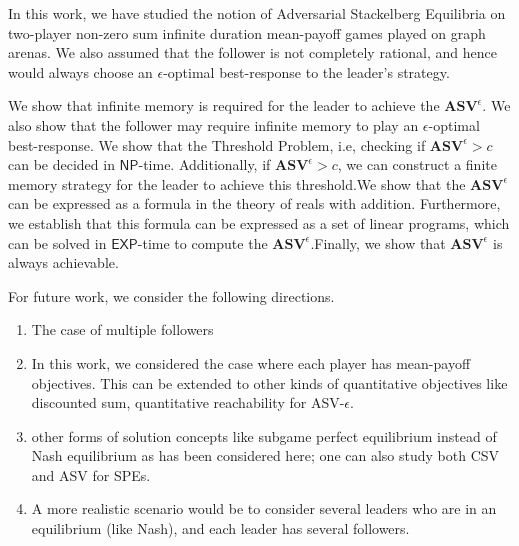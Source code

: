 In this work, we have studied the notion of Adversarial Stackelberg Equilibria on two-player non-zero sum infinite duration mean-payoff games played on graph arenas. We also assumed that the follower is not completely rational, and hence would always choose an $\epsilon$-optimal best-response to the leader's strategy.

We show that infinite memory is required for the leader to achieve the $\mathbf{ASV}^{\epsilon}$. We also show that the follower may require infinite memory to play an $\epsilon$-optimal best-response. We show that the Threshold Problem, i.e, checking if $\mathbf{ASV}^{\epsilon} > c$ can be decided in $\mathsf{NP}$-time. Additionally, if $\mathbf{ASV}^{\epsilon} > c$, we can construct a finite memory strategy for the leader to achieve this threshold.We show that the $\mathbf{ASV}^{\epsilon}$ can be expressed as a formula in the theory of reals with addition. Furthermore, we establish that this formula can be expressed as a set of linear programs, which can be solved in $\mathsf{EXP}$-time to compute the $\mathbf{ASV}^{\epsilon}$.Finally, we show that $\mathbf{ASV}^{\epsilon}$ is always achievable.

For future work, we consider the following directions.
\begin{enumerate}
    \item The case of multiple followers
    \item In this work, we considered the case where each player has mean-payoff objectives. This can be extended to other kinds of quantitative objectives like discounted sum, quantitative reachability for ASV-$\epsilon$.
    \item other forms of solution concepts like subgame perfect equilibrium instead of Nash equilibrium as has been considered here; one can also study both CSV and ASV for SPEs.
    \item A more realistic scenario would be to consider several leaders who are in an equilibrium (like Nash), and each leader has several followers.
\end{enumerate}